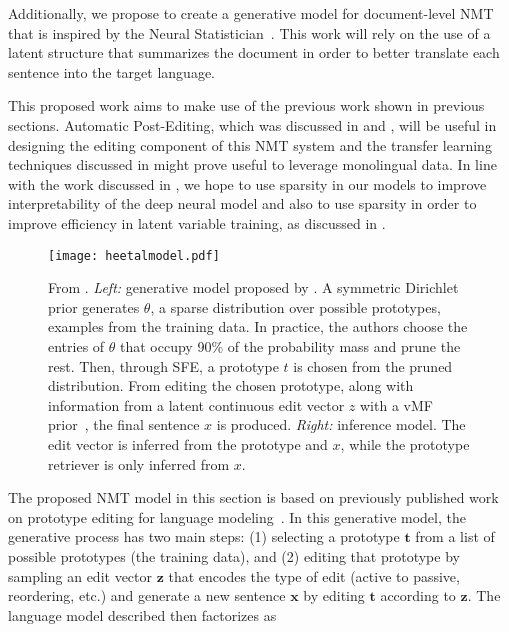 Additionally, we propose to create a generative model for
document-level NMT that is inspired by the Neural
Statistician~\citep{edwards2017prociclr}. This work will rely on the
use of a latent structure that summarizes the document in order to
better translate each sentence into the target language.

This proposed work aims to make use of the previous work shown in
previous sections. Automatic Post-Editing, which was discussed in
 and , will be useful in designing the
editing component of this NMT system and the transfer learning
techniques discussed in  might prove useful to leverage
monolingual data. In line with the work discussed in
, we hope to use sparsity in our models to
improve interpretability of the deep neural model and also to use
sparsity in order to improve efficiency in latent variable training,
as discussed in .


\begin{figure}[t]
    \centering
    \texttt{[image: heetalmodel.pdf]}
    \caption{From \citet{he2020LearningSparsePrototypes}. {\it Left:}
    generative model proposed by
    \citet{he2020LearningSparsePrototypes}. A symmetric Dirichlet
    prior generates $\theta$, a sparse distribution over possible
    prototypes, \ie examples from the training data. In practice, the
    authors choose the entries of $\theta$ that occupy 90\% of the
    probability mass and prune the rest. Then, through SFE, a
    prototype $t$ is chosen from the pruned distribution. From
    editing the chosen prototype, along with information from a
    latent continuous edit vector $z$ with a vMF
    prior~\citep{s-vae18}, the final sentence
    $x$ is produced. {\it Right:} inference model. The edit
    vector is inferred from the prototype and $x$, while the
    prototype retriever is only inferred from $x$.
    \label{fig:he2020LearningSparsePrototypes}}
\end{figure}

The proposed NMT model in this section is based on previously
published work on prototype editing for language
modeling~\citep{guu2018GeneratingSentencesEditing,
    he2020LearningSparsePrototypes}. In this generative model, the
generative process has two main steps: (1) selecting a prototype
$\bm{t}$ from a list of possible prototypes (\eg the training data),
and (2) editing that prototype by sampling an edit vector $\bm{z}$
that encodes the type of edit (\eg active to passive, reordering,
etc.) and generate a new sentence $\bm{x}$ by editing $\bm{t}$
according to $\bm{z}$. The language model described then factorizes
as

